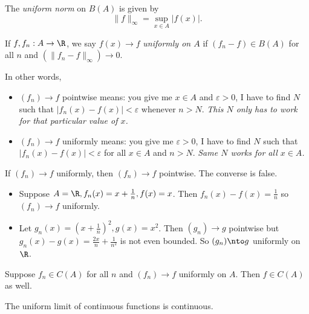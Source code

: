 \documentclass[a4paper]{article}
\theoremstyle{definition}
\begin{document}
\begin{defi}
  The \emph{uniform norm} on \(B(A)\) is given by
  \[
    \|f\|_\infty = \sup_{x\in A} |f(x)|.
  \]
\end{defi}

\begin{defi}
  If \(f, f_n: A\to \R\), we say \(f(x) \to f\) \emph{uniformly on \(A\)} if \((f_n-f) \in B(A)\) for all \(n\) and \((\|f_n-f\|_\infty)\to0\).
\end{defi}
    In other words,
    \begin{itemize}
    \item \((f_n)\to f\) pointwise means: you give me \(x\in A\) and \(\varepsilon >0\), I have to find \(N\) such that \(|f_n(x) - f(x)| < \varepsilon\) whenever \(n> N\). \emph{This \(N\) only has to work for that particular value of \(x\).}
    \item \((f_n)\to f\) uniformly means: you give me \(\varepsilon>0\), I have to find \(N\) such that \(|f_n(x) - f(x)|<\varepsilon\) for all \(x\in A\) and \(n>N\). \emph{Same \(N\) works for all \(x\in A\).}
\end{itemize}

\begin{ex}
  If \((f_n)\to f \) uniformly, then \((f_n)\to f\) pointwise. The converse is false.
\end{ex}

\begin{eg}\leavevmode
  \begin{itemize}
  \item Suppose \(A=\R,f_n(x)=x+\frac{1}{n},f(x)=x\). Then \(f_n(x)-f(x)=\frac{1}{n}\) so \((f_n)\to f\) uniformly.
  \item Let \(g_n(x) = (x+\frac{1}{n})^2, g(x) = x^2\). Then \((g_n)\to g\) pointwise but \(g_n(x) - g(x) = \frac{2x}{n} + \frac{1}{n^2}\) is not even bounded. So \((g_n)\nto g\) uniformly on \(\R\).
  \end{itemize}
\end{eg}

\begin{thm}
  Suppose \(f_n \in C(A)\) for all \(n\) and \((f_n)\to f\) uniformly on \(A\). Then \(f\in C(A)\) as well.
\end{thm}

\begin{slogan}
  The uniform limit of continuous functions is continuous.
\end{slogan}
\end{document}
